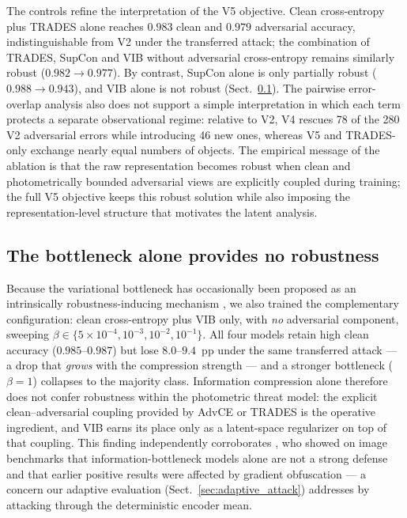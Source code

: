 \documentclass{aa}
\begin{document}
The controls refine the interpretation of the V5 objective. Clean
cross-entropy plus TRADES alone reaches $0.983$ clean and $0.979$
adversarial accuracy, indistinguishable from V2 under the transferred
attack; the combination of TRADES, SupCon and VIB without adversarial
cross-entropy remains similarly robust ($0.982 \to 0.977$). By contrast,
SupCon alone is only partially robust ($0.988 \to 0.943$), and VIB alone
is not robust (Sect.~\ref{app:vib_only}). The pairwise error-overlap
analysis also does
not support a simple interpretation in which each term protects a separate
observational regime: relative to V2, V4 rescues 78 of the 280 V2
adversarial errors while introducing 46 new ones, whereas V5 and
TRADES-only exchange nearly equal numbers of objects. The empirical
message of the ablation is that the raw representation becomes robust when
clean and photometrically bounded adversarial views are explicitly coupled
during training; the full V5 objective keeps this robust solution while
also imposing the representation-level structure that motivates the latent
analysis.

\subsection{The bottleneck alone provides no robustness}
\label{app:vib_only}
Because the variational bottleneck has occasionally been proposed as an
intrinsically robustness-inducing mechanism \citep{alemi2017deep}, we also
trained the complementary configuration: clean cross-entropy plus VIB only,
with \emph{no} adversarial component, sweeping
$\beta \in \{5\times10^{-4}, 10^{-3}, 10^{-2}, 10^{-1}\}$. All four models
retain high clean accuracy ($0.985$--$0.987$) but lose $8.0$--$9.4$~pp
under the same transferred attack --- a drop that \emph{grows} with the
compression strength --- and a stronger bottleneck ($\beta=1$) collapses to
the majority class. Information compression alone therefore does not
confer robustness within the photometric threat model: the explicit
clean--adversarial coupling provided by AdvCE or TRADES is the operative
ingredient, and VIB earns its place only as a latent-space regularizer on
top of that coupling. This finding independently corroborates
\citet{korshunova2021closer}, who showed on image benchmarks that
information-bottleneck models alone are not a strong defense and that
earlier positive results were affected by gradient obfuscation --- a
concern our adaptive evaluation (Sect.~\ref{sec:adaptive_attack})
addresses by attacking through the deterministic encoder mean.
\end{document}
